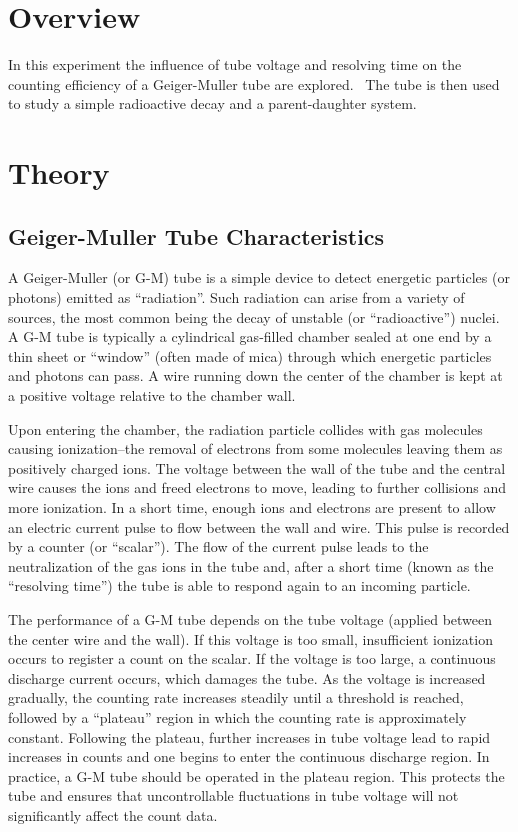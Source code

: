 \section{Overview}

In this experiment the influence of tube voltage and resolving time on
the counting efficiency of a Geiger-Muller tube are explored. \ The
tube is then used to study a simple radioactive decay and a
parent-daughter system.

\section{Theory}

\subsection{Geiger-Muller Tube Characteristics}
\label{sec:GMtubes}

A Geiger-Muller (or G-M) tube is a simple device to detect energetic particles
(or photons) emitted as ``radiation''.  Such radiation can arise from a variety
of sources, the most common being the decay of unstable (or ``radioactive'')
nuclei. A G-M tube is typically a cylindrical gas-filled chamber sealed at one
end by a thin sheet or ``window'' (often made of mica) through which energetic
particles and photons can pass. A wire running down the center of the chamber is
kept at a positive voltage relative to the chamber wall.

Upon entering the chamber, the radiation particle collides with gas molecules
causing ionization--the removal of electrons from some molecules leaving them
as positively charged ions.  The voltage between the wall of the tube and the
central wire causes the ions and freed electrons to move, leading to further
collisions and more ionization.  In a short time, enough ions and electrons are
present to allow an electric current pulse to flow between the wall and wire.
This pulse is recorded by a counter (or ``scalar''). The flow of the current
pulse leads to the neutralization of the gas ions in the tube and, after a short
time (known as the ``resolving time'') the tube is able to respond again to an
incoming particle.

The performance of a G-M tube depends on the tube voltage (applied between the
center wire and the wall).  If this voltage is too small, insufficient
ionization occurs to register a count on the scalar.  If the voltage is too
large, a continuous discharge current occurs, which damages the tube.  As the
voltage is increased gradually, the counting rate increases steadily until a
threshold is reached, followed by a ``plateau'' region in which the counting
rate is approximately constant.  Following the plateau, further increases in
tube voltage lead to rapid increases in counts and one begins to enter the
continuous discharge region.  In practice, a G-M tube should be operated in the
plateau region.  This protects the tube and ensures that uncontrollable
fluctuations in tube voltage will not significantly affect the count data.

